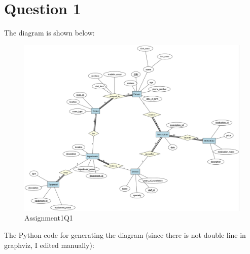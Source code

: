 \documentclass{article}
\begin{document}
\section*{Question 1}
The diagram is shown below:

\begin{figure}[h]
    \centering
    \includegraphics[width=1\linewidth]{Assignment1Q1.png}
    \caption{Assignment1Q1}
    \label{Assignment1Q1}
\end{figure}

The Python code for generating the diagram (since there is not double line in graphviz, I edited manually):
\end{document}
